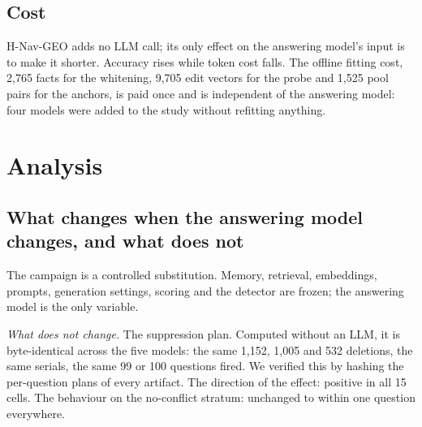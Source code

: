 \documentclass[journal=jcisd8,manuscript=article]{achemso}
\begin{document}
\subsection{Cost}

\begin{table}[H]\centering\small
\caption{Plan and cost per subset; identical for every answering model.}\label{tab:cost}
\end{table}

H-Nav-GEO adds no LLM call; its only effect on the answering model's input is to make it shorter. Accuracy rises while token cost falls. The offline fitting cost, 2,765 facts for the whitening, 9,705 edit vectors for the probe and 1,525 pool pairs for the anchors, is paid once and is independent of the answering model: four models were added to the study without refitting anything.

\section{Analysis}
\label{sec:analysis}

\subsection{What changes when the answering model changes, and what does not}
\label{sec:substitution}

The campaign is a controlled substitution. Memory, retrieval, embeddings, prompts, generation settings, scoring and the detector are frozen; the answering model is the only variable.

\emph{What does not change.} The suppression plan. Computed without an LLM, it is byte-identical across the five models: the same 1,152, 1,005 and 532 deletions, the same serials, the same 99 or 100 questions fired. We verified this by hashing the per-question plans of every artifact. The direction of the effect: positive in all 15 cells. The behaviour on the no-conflict stratum: unchanged to within one question everywhere.
\end{document}
